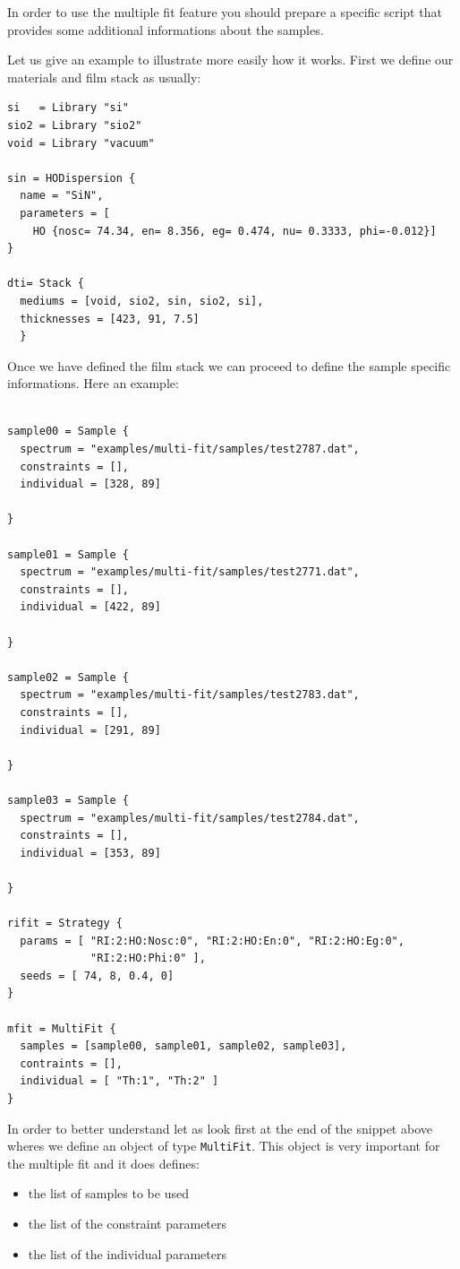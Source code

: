 \documentclass[a4paper]{report}
\begin{document}
In order to use the multiple fit feature you should prepare a specific script that provides some additional informations about the samples.

Let us give an example to illustrate more easily how it works. First we define our materials and film stack as usually:
\begin{verbatim}
si   = Library "si"
sio2 = Library "sio2"
void = Library "vacuum"

sin = HODispersion {
  name = "SiN",
  parameters = [
    HO {nosc= 74.34, en= 8.356, eg= 0.474, nu= 0.3333, phi=-0.012}]
}

dti= Stack {
  mediums = [void, sio2, sin, sio2, si],
  thicknesses = [423, 91, 7.5]
  }
\end{verbatim}
Once we have defined the film stack we can proceed to define the sample specific informations. Here an example:

\begin{verbatim}

sample00 = Sample {
  spectrum = "examples/multi-fit/samples/test2787.dat",
  constraints = [],
  individual = [328, 89]

}

sample01 = Sample {
  spectrum = "examples/multi-fit/samples/test2771.dat",
  constraints = [],
  individual = [422, 89]

}

sample02 = Sample {
  spectrum = "examples/multi-fit/samples/test2783.dat",
  constraints = [],
  individual = [291, 89]

}

sample03 = Sample {
  spectrum = "examples/multi-fit/samples/test2784.dat",
  constraints = [],
  individual = [353, 89]

}

rifit = Strategy {
  params = [ "RI:2:HO:Nosc:0", "RI:2:HO:En:0", "RI:2:HO:Eg:0",
             "RI:2:HO:Phi:0" ],
  seeds = [ 74, 8, 0.4, 0]
}

mfit = MultiFit {
  samples = [sample00, sample01, sample02, sample03],
  contraints = [],
  individual = [ "Th:1", "Th:2" ]    
}
\end{verbatim}

In order to better understand let as look first at the end of the snippet above wheres we define an object of type \texttt{MultiFit}. This object is very important for the multiple fit and it does defines:
\begin{itemize}
  \item the list of samples to be used
  \item the list of the constraint parameters
  \item the list of the individual parameters
\end{itemize}
\end{document}

